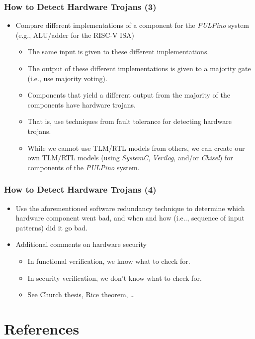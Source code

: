\documentclass[xcolor={usenames,dvipsnames},hyperref={hyperindex,bookmarks}]{beamer}
\begin{document}
\frame
{
	\frametitle{How to Detect Hardware Trojans (3)}

	\begin{itemize}
	\item Compare different implementations of a component for the {\it PULPino} system (e.g., ALU/adder for the RISC-V ISA)
		\begin{itemize}
		\item The same input is given to these different implementations.
		\item The output of these different implementations is given to a majority gate (i.e., use majority voting).
		\item Components that yield a different output from the majority of the components have hardware trojans.
		\item That is, use techniques from fault tolerance for detecting hardware trojans. 
		\item While we cannot use TLM/RTL models from others, we can create our own TLM/RTL models (using {\it SystemC}, {\it Verilog}, and/or {\it Chisel}) for components of the {\it PULPino} system.
		\end{itemize}
	\end{itemize}
}





\frame
{
	\frametitle{How to Detect Hardware Trojans (4)}

	\begin{itemize}
	\item Use the aforementioned software redundancy technique to determine which hardware component went bad, and when and how (i.e.., sequence of input patterns) did it go bad.
	\item Additional comments on hardware security
		\begin{itemize}
		\item In functional verification, we know what to check for.
		\item In security verification, we don't know what to check for.
		\item See Church thesis, Rice theorem, \dots
		\end{itemize}
	\end{itemize}
}








\section{References}
\end{document}
